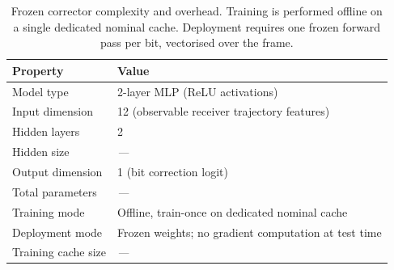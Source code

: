 \begin{table}[t]
\centering
\caption{Frozen corrector complexity and overhead. Training is performed offline on a single dedicated nominal cache. Deployment requires one frozen forward pass per bit, vectorised over the frame.}
\label{tab:complexity}
\setlength{\tabcolsep}{5pt}
\begin{tabular}{ll}
\toprule
\textbf{Property} & \textbf{Value} \\
\midrule
Model type & 2-layer MLP (ReLU activations) \\
Input dimension & 12 (observable receiver trajectory features) \\
Hidden layers & 2 \\
Hidden size & \textit{---} \\
Output dimension & 1 (bit correction logit) \\
Total parameters & \textit{---} \\
Training mode & Offline, train-once on dedicated nominal cache \\
Deployment mode & Frozen weights; no gradient computation at test time \\
Training cache size & \textit{---} \\
\bottomrule
\end{tabular}
\end{table}
